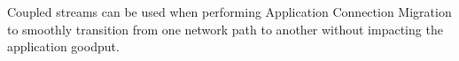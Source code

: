Coupled streams can be used when performing Application Connection
Migration to smoothly transition from one network path to another without
impacting the application goodput.





